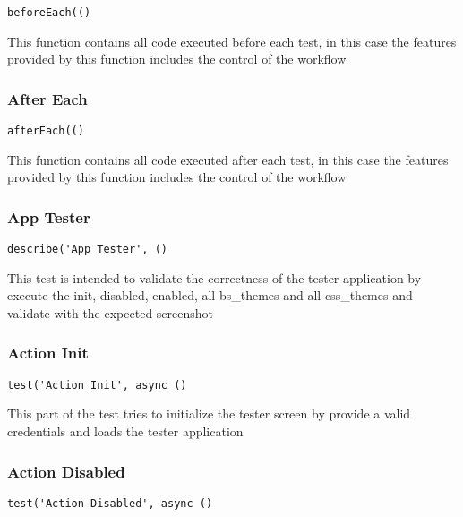 \documentclass[a4paper]{article}
\begin{document}
\begin{lstlisting}
beforeEach(()
\end{lstlisting}

This function contains all code executed before each test, in this case the
features provided by this function includes the control of the workflow

\hypertarget{toc268}{}
\subsubsection{After Each}

\begin{lstlisting}
afterEach(()
\end{lstlisting}

This function contains all code executed after each test, in this case the
features provided by this function includes the control of the workflow

\hypertarget{toc269}{}
\subsubsection{App Tester}

\begin{lstlisting}
describe('App Tester', ()
\end{lstlisting}

This test is intended to validate the correctness of the tester application
by execute the init, disabled, enabled, all bs\_themes and all css\_themes and
validate with the expected screenshot

\hypertarget{toc270}{}
\subsubsection{Action Init}

\begin{lstlisting}
test('Action Init', async ()
\end{lstlisting}

This part of the test tries to initialize the tester screen by provide a
valid credentials and loads the tester application

\hypertarget{toc271}{}
\subsubsection{Action Disabled}

\begin{lstlisting}
test('Action Disabled', async ()
\end{lstlisting}
\end{document}
